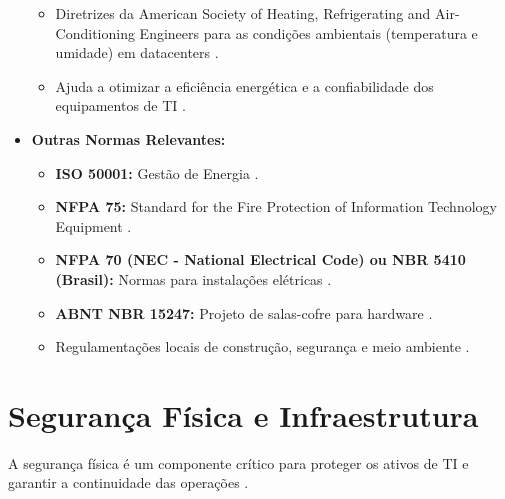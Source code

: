 \documentclass[
	12pt,				%
	oneside,			%
	a4paper,			%
	english,			%
	brazil				%
	]{abntex2unama}
\begin{document}
\begin{itemize}
\begin{itemize}
		      \item Diretrizes da American Society of Heating, Refrigerating and Air-Conditioning Engineers para as condições ambientais (temperatura e umidade) em datacenters \cite{cooling_technologies}.
		      \item Ajuda a otimizar a eficiência energética e a confiabilidade dos equipamentos de TI \cite{energy_efficiency}.
	      \end{itemize}
	\item \textbf{Outras Normas Relevantes:}
	      \begin{itemize}
		      \item \textbf{ISO 50001:} Gestão de Energia \cite{green_datacenters}.
		      \item \textbf{NFPA 75:} Standard for the Fire Protection of Information Technology Equipment \cite{disaster_recovery}.
		      \item \textbf{NFPA 70 (NEC - National Electrical Code) ou NBR 5410 (Brasil):} Normas para instalações elétricas \cite{power_distribution}.
		      \item \textbf{ABNT NBR 15247:} Projeto de salas-cofre para hardware \cite{datacenter_security}.
		      \item Regulamentações locais de construção, segurança e meio ambiente \cite{green_datacenters}.
	      \end{itemize}
\end{itemize}

\chapter{Segurança Física e Infraestrutura}
A segurança física é um componente crítico para proteger os ativos de TI e garantir a continuidade das operações \cite{datacenter_security}.
\end{document}
